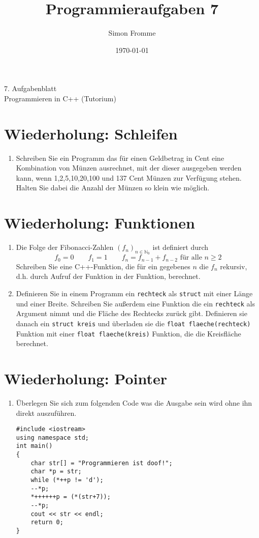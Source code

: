 \documentclass[paper=a4, fontsize=11pt, twoside]{scrartcl}
\title{Programmieraufgaben 7}
\author{Simon Fromme}
\date{\normalsize\today}
\begin{document}
\vspace*{0.75\baselineskip}
\begin{center}
  \Large 7. Aufgabenblatt \\\vspace{0.5em} \large Programmieren in C++ (Tutorium)
\end{center}
\section*{Wiederholung: Schleifen}
\begin{enumerate}
	\item Schreiben Sie ein Programm das für einen Geldbetrag in Cent eine Kombination von Münzen ausrechnet, mit der dieser ausgegeben werden kann, wenn 1,2,5,10,20,100 und 137 Cent Münzen zur Verfügung stehen. Halten Sie dabei die Anzahl der Münzen so klein wie möglich. 
\end{enumerate}


\section*{Wiederholung: Funktionen}
\begin{enumerate}[resume]
  \item Die Folge der Fibonacci-Zahlen $(f_{n})_{n\in\mathbb{N}_0}$ ist definiert durch 
	  \[
		  f_0=0 \qquad f_1=1 \qquad f_n=f_{n-1} + f_{n-2} \text{ für alle } n\geq 2
	  \]
	  Schreiben Sie eine C++-Funktion, die für ein gegebenes $n$ die $f_n$ rekursiv, d.h. durch Aufruf der Funktion in der Funktion, berechnet.
  \item Definieren Sie in einem Programm ein \texttt{rechteck} als \texttt{struct} mit einer Länge und einer Breite.
	  Schreiben Sie außerdem eine Funktion die ein \texttt{rechteck} als Argument nimmt und die Fläche des Rechtecks zurück gibt. 
	  Definieren sie danach ein \texttt{struct kreis} und überladen sie die \texttt{float flaeche(rechteck)} Funktion mit einer \texttt{float flaeche(kreis)} Funktion, die die Kreisfläche berechnet.
\end{enumerate}

\section*{Wiederholung: Pointer}
\begin{enumerate}[resume]
  \item Überlegen Sie sich zum folgenden Code was die Ausgabe sein wird ohne ihn direkt auszuführen. 
	  \begin{verbatim}
#include <iostream>
using namespace std;
int main()
{
	char str[] = "Programmieren ist doof!";
	char *p = str;
	while (*++p != 'd');
	--*p;
	*++++++p = (*(str+7));
	--*p;
	cout << str << endl;
	return 0;
}
	  \end{verbatim}
\end{enumerate}
\end{document}
